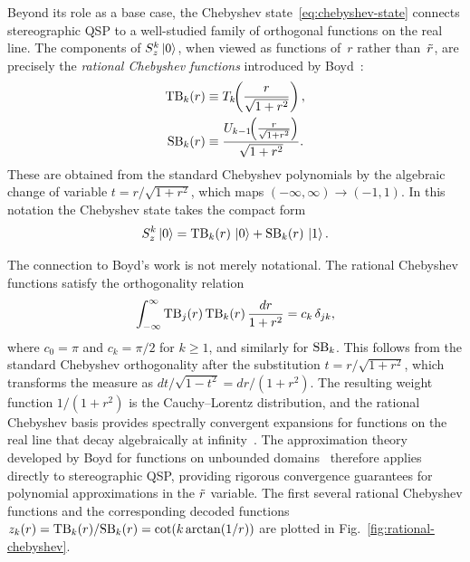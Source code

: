 Beyond its role as a base case, the Chebyshev
state~\eqref{eq:chebyshev-state} connects stereographic QSP
to a well-studied family of orthogonal functions on the real
line.  The components of $S_z^k\ket{0}$, when viewed as
functions of~$r$ rather than~$\tilde{r}$, are precisely the
\emph{rational Chebyshev functions} introduced by
Boyd~\cite{Boyd1990,Boyd1987}:
\begin{align}
	\mathrm{TB}_k(r) & \equiv T_k\!\!\left(\frac{r}{\sqrt{1+r^2}}\right), \nonumber                \\
	\mathrm{SB}_k(r) & \equiv \frac{U_{k-1}\!\!\left(\frac{r}{\sqrt{1+r^2}}\right)}{\sqrt{1+r^2}}.
	\label{eq:rational-chebyshev}
\end{align}
These are obtained from the standard Chebyshev polynomials by
the algebraic change of variable
$t = r/\sqrt{1+r^2}$, which maps
$(-\infty, \infty) \to (-1,1)$.  In this notation the
Chebyshev state takes the compact form
\begin{equation}
	S_z^k\ket{0} = \mathrm{TB}_k(r)\,\ket{0} + \mathrm{SB}_k(r)\,\ket{1}.
	\label{eq:rational-chebyshev-state}
\end{equation}

The connection to Boyd's work is not merely notational.  The
rational Chebyshev functions satisfy the orthogonality
relation
\begin{equation}
	\int_{-\infty}^{\infty} \mathrm{TB}_j(r)\,\mathrm{TB}_k(r)\,\frac{dr}{1+r^2} = c_k\,\delta_{jk},
	\label{eq:orthogonality}
\end{equation}
where $c_0 = \pi$ and $c_k = \pi/2$ for $k \geq 1$, and
similarly for $\mathrm{SB}_k$.  This follows from the standard
Chebyshev orthogonality after the substitution
$t = r/\sqrt{1+r^2}$, which transforms the measure as
$dt/\sqrt{1-t^2} = dr/(1+r^2)$.  The resulting weight
function $1/(1+r^2)$ is the Cauchy--Lorentz distribution, and
the rational Chebyshev basis provides spectrally convergent
expansions for functions on the real line that decay
algebraically at infinity~\cite{Boyd1987}.  The approximation
theory developed by Boyd for functions on unbounded
domains~\cite{Boyd1990} therefore applies directly to
stereographic QSP, providing rigorous convergence guarantees
for polynomial approximations in the $\tilde{r}$ variable.
The first several rational Chebyshev functions and the
corresponding decoded functions
$z_k(r) = \mathrm{TB}_k(r)/\mathrm{SB}_k(r) = \cot(k\arctan(1/r))$ are
plotted in Fig.~\ref{fig:rational-chebyshev}.

